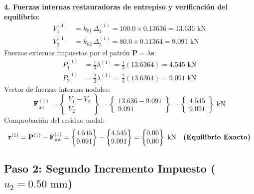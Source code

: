 \documentclass[11pt,letterpaper]{article}
\begin{document}
\begin{stepbox}
\vspace{0.2cm}
\textbf{4. Fuerzas internas restauradoras de entrepiso y verificación del equilibrio:}
\begin{align}
    V_1^{(1)} &= k_{01} \, \Delta_1^{(1)} = 100.0 \times 0.13636 = 13.636\text{ kN} \\
    V_2^{(1)} &= k_{02} \, \Delta_2^{(1)} = 80.0 \times 0.11364 = 9.091\text{ kN}
\end{align}
Fuerzas externas impuestas por el patrón $\mathbf{P} = \lambda \mathbf{s}$:
\begin{align}
    P_1^{(1)} &= \frac{1}{3} \lambda^{(1)} = \frac{1}{3}(13.6364) = 4.545\text{ kN} \\
    P_2^{(1)} &= \frac{2}{3} \lambda^{(1)} = \frac{2}{3}(13.6364) = 9.091\text{ kN}
\end{align}
Vector de fuerzas internas nodales:
\begin{equation}
    \mathbf{F}_{\text{int}}^{(1)} = \begin{Bmatrix} V_1 - V_2 \\ V_2 \end{Bmatrix} = \begin{Bmatrix} 13.636 - 9.091 \\ 9.091 \end{Bmatrix} = \begin{Bmatrix} 4.545 \\ 9.091 \end{Bmatrix}\text{ kN}
\end{equation}
Comprobación del residuo nodal:
\begin{equation}
    \mathbf{r}^{(1)} = \mathbf{P}^{(1)} - \mathbf{F}_{\text{int}}^{(1)} = \begin{Bmatrix} 4.545 \\ 9.091 \end{Bmatrix} - \begin{Bmatrix} 4.545 \\ 9.091 \end{Bmatrix} = \begin{Bmatrix} 0.00 \\ 0.00 \end{Bmatrix}\text{ kN} \quad \text{\textbf{(Equilibrio Exacto)}}
\end{equation}
\end{stepbox}

\subsection{Paso 2: Segundo Incremento Impuesto (\texorpdfstring{$u_2 = 0.50\text{ mm}$}{u2 = 0.50 mm})}
\end{document}
